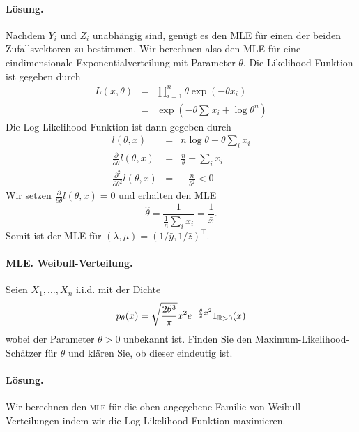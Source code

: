 \paragraph*{Lösung.}    Nachdem $Y_i$ und $Z_i$ unabhängig sind, genügt es den 
MLE für einen der beiden Zufallsvektoren zu bestimmen. Wir berechnen also den MLE für eine
eindimensionale Exponentialverteilung mit Parameter $\theta$.
Die Likelihood-Funktion ist gegeben durch
\begin{eqnarray}
	L(x, \theta) &=&  \prod_{i=1}^n \theta \exp\left(  -\theta x_i \right) \\
	&=&  \exp \left(  -\theta \sum_{}^{} x_i + \log \theta^n \right)
\end{eqnarray}
Die Log-Likelihood-Funktion ist dann gegeben durch
\begin{eqnarray}
	l(\theta, x) &=& n \log \theta - \theta \sum_{i}^{} x_i \\
	\frac{\partial}{\partial \theta} l(\theta,x) &=&  \frac{n}{\theta } - \sum_{i}^{} x_i \\
	\frac{\partial^2}{\partial \theta^2} l(\theta,x) &=& - \frac{n}{\theta^2} < 0
\end{eqnarray}
Wir setzen $\frac{\partial}{\partial \theta} l(\theta,x) = 0$ und erhalten den MLE
\begin{equation}
	\hat \theta = \frac{1}{\frac{1}{n} \sum_{i}^{} x_i} = \frac{1}{\bar x}.
\end{equation}
Somit ist der MLE für $\left( \lambda, \mu \right) = \left( 1/\bar y, 1/\bar z \right)^\top$.


\paragraph{MLE. Weibull-Verteilung. } Seien $X_1,\ldots,X_n$ i.i.d.
mit der Dichte 
\begin{equation}
	p_\theta(x)=
	\sqrt{\frac{2\theta^3}{\pi}} x^2 e^{ - \frac{\theta}{2}x^2} 1_{\mathbb R>0}(x)
\end{equation}
wobei der Parameter $\theta>0$ unbekannt ist. Finden Sie
den Maximum-Likelihood-Schätzer für $ \theta$ und klären Sie, ob dieser
eindeutig ist.

\paragraph*{Lösung. } Wir berechnen den \textsc{mle} für die oben angegebene Familie von Weibull-Verteilungen
indem wir die Log-Likelihood-Funktion maximieren. 

